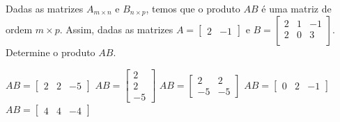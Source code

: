 Dadas as matrizes $A_{m\times n}$ e $B_{n\times p}$, temos que o produto $AB$ é uma matriz de ordem $m\times p$. Assim, dadas as matrizes $A = \left[ \begin{array}{cc}
2 & -1
\end{array} \right] $ e $B= \left[ \begin{array}{ccc}
2 & 1 & -1 \\
2 & 0 & 3 \\
\end{array} \right]$. Determine o produto $AB$.

$AB=\left[ \begin{array}{ccc} 2 & 2 & -5 \end{array} \right]$
$AB=\left[ \begin{array}{c} 2 \\ 2 \\ -5 \end{array} \right]$
$AB=\left[ \begin{array}{ccc} 2 & 2\\ -5 & -5 \end{array} \right]$
$AB=\left[ \begin{array}{ccc} 0 & 2 & -1 \end{array} \right]$
$AB=\left[ \begin{array}{ccc} 4 & 4 & -4 \end{array} \right]$


